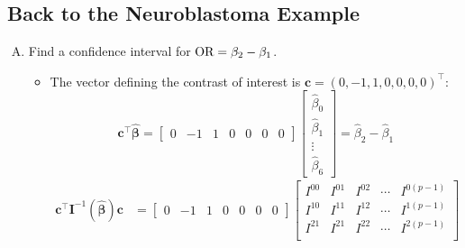 \documentclass[oneside]{book}\usepackage[]{graphicx}\usepackage[svgnames]{xcolor}
\let\exp\relax%
\providecommand{\Vector}[1]{\bm{#1}}%
\providecommand{\Matrix}[1]{\bm{#1}}
\begin{document}
\subsection*{Back to the Neuroblastoma Example}
\begin{enumerate}[B.]
      \item Find a confidence interval for $ \text{OR}=\exp{\beta_2-\beta_1} $.
            \begin{itemize}
                  \item The vector defining the contrast of interest is $ \Vector{c}=(0,-1,1,0,0,0,0)^\top $:
                        \[ \Vector{c}^\top \hat{\Vector{\beta}}=\begin{bmatrix}
                                    0 & -1 & 1 & 0 & 0 & 0 & 0
                              \end{bmatrix}\begin{bmatrix}
                                    \hat{\beta}_0 \\
                                    \hat{\beta}_1 \\
                                    \vdots        \\
                                    \hat{\beta}_6
                              \end{bmatrix}=\hat{\beta}_2-\hat{\beta}_1 \]
                        \begin{align*}
                              \Vector{c}^\top \Matrix{I}^{-1}(\hat{\Vector{\beta}})\Vector{c} & =\begin{bmatrix}
                                                                                                       0 & -1 & 1 & 0 & 0 & 0 & 0
                                                                                                 \end{bmatrix}\begin{bmatrix}
                                                                                                                    I^{00}     & I^{01}     & I^{02}     & \cdots & I^{0(p-1)}     \\
                                                                                                                    I^{10}     & I^{11}     & I^{12}     & \cdots & I^{1(p-1)}     \\
                                                                                                                    I^{21}     & I^{21}     & I^{22}     & \cdots & I^{2(p-1)}     \\

\end{bmatrix}
\end{align*}
\end{itemize}
\end{enumerate}
\end{document}
